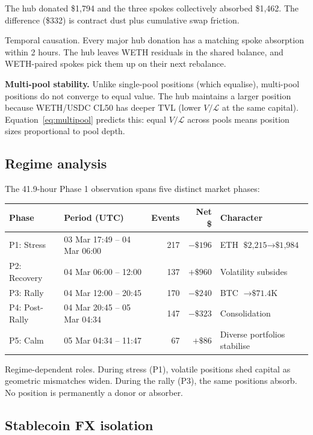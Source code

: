 \documentclass[11pt,a4paper]{article}
\begin{document}
The hub donated \$1{,}794 and the three spokes collectively absorbed \$1{,}462. The difference (\$332) is contract dust plus cumulative swap friction.

Temporal causation. Every major hub donation has a matching spoke absorption within 2 hours. The hub leaves WETH residuals in the shared balance, and WETH-paired spokes pick them up on their next rebalance.

\textbf{Multi-pool stability.} Unlike single-pool positions (which equalise), multi-pool positions do not converge to equal value. The hub maintains a larger position because WETH/USDC CL50 has deeper TVL (lower $V/\mathcal{L}$ at the same capital). Equation~\eqref{eq:multipool} predicts this: equal $V/\mathcal{L}$ across pools means position sizes proportional to pool depth.

\subsection{Regime analysis}\label{sec:regime}

The 41.9-hour Phase 1 observation spans five distinct market phases:

\begin{table}[H]
\centering
\begin{tabular}{@{}llrrl@{}}
\toprule
Phase & Period (UTC) & Events & Net \$ & Character \\
\midrule
P1: Stress      & 03 Mar 17:49 -- 04 Mar 06:00 & 217 & $-\$196$ & ETH $\text{\$2{,}215} \to \text{\$1{,}984}$ \\
P2: Recovery    & 04 Mar 06:00 -- 12:00         & 137 & $+\$960$ & Volatility subsides \\
P3: Rally       & 04 Mar 12:00 -- 20:45         & 170 & $-\$240$ & BTC $\to \text{\$71.4K}$ \\
P4: Post-Rally  & 04 Mar 20:45 -- 05 Mar 04:34  & 147 & $-\$323$ & Consolidation \\
P5: Calm        & 05 Mar 04:34 -- 11:47         & 67  & $+\$86$  & Diverse portfolios stabilise \\
\bottomrule
\end{tabular}
\end{table}

Regime-dependent roles. During stress (P1), volatile positions shed capital as geometric mismatches widen. During the rally (P3), the same positions absorb. No position is permanently a donor or absorber.

\subsection{Stablecoin FX isolation}\label{sec:fx-isolation}
\end{document}
